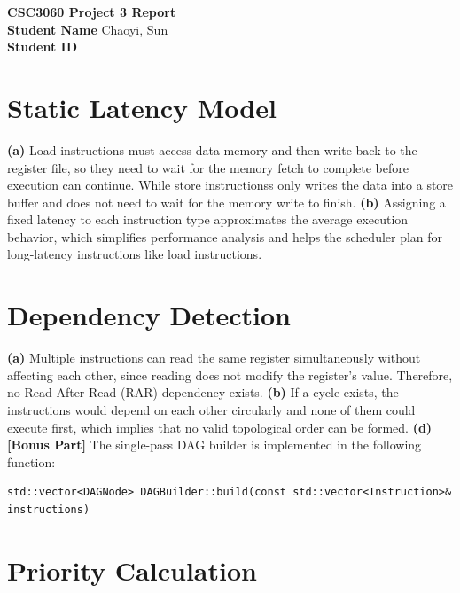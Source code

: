 \documentclass[11pt]{article}
\begin{document}
\begin{center}
    \centering
    {\Huge \textbf{CSC3060 Project 3 Report}} \\[0.5cm]
    
    \textbf{Student Name} \quad Chaoyi, Sun \\[0.1cm]
    \textbf{Student ID}  \\[1cm]
\end{center}

\section{Static Latency Model}
\textbf{(a)} Load instructions must access data memory and then write back to the register file, so they need to wait for the memory fetch to complete before execution can continue. While store instructionss only writes the data into a store buffer and does not need to wait for the memory write to finish.
\newline
\textbf{(b)} Assigning a fixed latency to each instruction type approximates the average execution behavior, which simplifies performance analysis and helps the scheduler plan for long-latency instructions like load instructions.

\section{Dependency Detection}

\textbf{(a)} Multiple instructions can read the same register simultaneously without affecting each other, since reading does not modify the register's value. Therefore, no Read-After-Read (RAR) dependency exists.
\newline
\textbf{(b)} If a cycle exists, the instructions would depend on each other circularly and none of them could execute first, which implies that no valid topological order can be formed.
\newline
\textbf{(d) [Bonus Part]} The single-pass DAG builder is implemented in the following function:

\begin{verbatim}
std::vector<DAGNode> DAGBuilder::build(const std::vector<Instruction>& instructions)
\end{verbatim}

\section{Priority Calculation}
\end{document}
